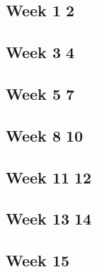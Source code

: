 \subsection{Week 1\,\textendash\,2}
\label{subsec:planned-week1-2}

\subsection{Week 3\,\textendash\,4}
\label{subsec:planned-week3-4}

\subsection{Week 5\,\textendash\,7}
\label{subsec:planned-week5-7}

\subsection{Week 8\,\textendash\,10}
\label{subsec:planned-week8-10}

\subsection{Week 11\,\textendash\,12}
\label{subsec:planned-week11-12}

\subsection{Week 13\,\textendash\,14}
\label{subsec:planned-week13-14}

\subsection{Week 15}
\label{subsec:planned-week15}
